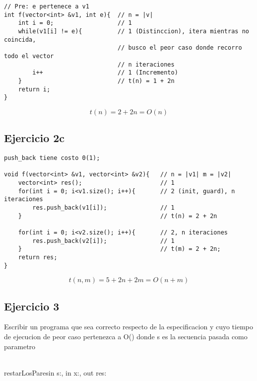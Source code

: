 \documentclass{article}
\begin{document}
\begin{lstlisting}
// Pre: e pertenece a v1
int f(vector<int> &v1, int e){  // n = |v|
    int i = 0;                  // 1
    while(v1[i] != e){          // 1 (Distinccion), itera mientras no coincida,
                                // busco el peor caso donde recorro todo el vector
                                // n iteraciones
        i++                     // 1 (Incremento)
    }                           // t(n) = 1 + 2n
    return i;                   
}
\end{lstlisting}
\begin{equation}
    t(n) = 2 + 2n = O(n)
\end{equation}

\subsection{Ejercicio 2c}

\begin{lstlisting}
push_back tiene costo 0(1);

void f(vector<int> &v1, vector<int> &v2){   // n = |v1| m = |v2|
    vector<int> res();                      // 1
    for(int i = 0; i<v1.size(); i++){       // 2 (init, guard), n iteraciones
        res.push_back(v1[i]);               // 1
    }                                       // t(n) = 2 + 2n

    for(int i = 0; i<v2.size(); i++){       // 2, n iteraciones
        res.push_back(v2[i]);               // 1
    }                                       // t(m) = 2 + 2n;
    return res;                             
}
\end{lstlisting}
\begin{equation}
    t(n, m) = 5 + 2n + 2m = O(n + m)
\end{equation}


\subsection{Ejercicio 3}    
Escribir un programa que sea correcto respecto de la especificacion y cuyo 
tiempo de ejecucion de peor caso pertenezca a O() donde s es la secuencia pasada
como parametro\\ \\
\begin{proc}{restarLosPares}{in s:\TLista{\ent}, in x:\ent, out res:\TLista{\ent}}{}
    \pre{\True}
\end{proc}
\end{document}
